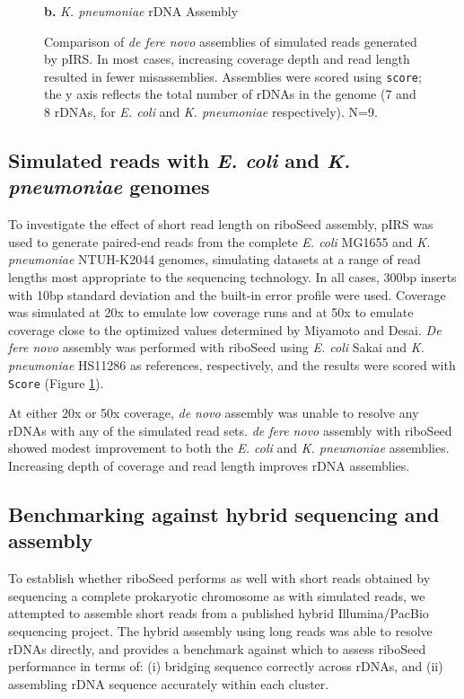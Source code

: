 \documentclass[a4,center,fleqn]{NAR}
\begin{document}
\begin{figure}[!ht]
\begin{minipage}{.45\textwidth}
    {\footnotesize \textbf{b.} \textit{K. pneumoniae} rDNA Assembly}
    \label{fig:sim_kleb}
  \end{minipage}%
  \caption{Comparison of \textit{de fere novo} assemblies of simulated reads generated by pIRS. In most cases, increasing coverage depth and read length resulted in fewer misassemblies. Assemblies were scored using \texttt{score}; the y axis reflects the total number of rDNAs in the genome (7 and 8 rDNAs, for \textit{E. coli} and \textit{K. pneumoniae} respectively). N=9.}
  \label{fig:simreads}
\end{figure}


\subsection*{Simulated reads with \textit{E. coli} and \textit{K. pneumoniae} genomes}

To investigate the effect of short read length on riboSeed assembly, pIRS\cite{Hu2012} was used to generate paired-end reads from the complete \textit{E. coli} MG1655 and \textit{K. pneumoniae} NTUH-K2044 genomes, simulating datasets at a range of read lengths most appropriate to the sequencing technology. In all cases, 300bp inserts with 10bp standard deviation and the built-in error profile were used. Coverage was simulated at 20x to emulate low coverage runs and at 50x to emulate coverage close to the optimized values determined by Miyamoto\cite{Miyamoto2014} and Desai\cite{Desai2013}. \textit{De fere novo} assembly was performed with riboSeed using \textit{E. coli} Sakai and \textit{K. pneumoniae} HS11286 as references, respectively, and the results were scored with \texttt{Score} (Figure \ref{fig:simreads}).


At either 20x or 50x coverage, \textit{de novo} assembly was unable to resolve any rDNAs with any of the simulated read sets. \textit{de fere novo} assembly with riboSeed showed modest improvement to both the \textit{E. coli} and \textit{K. pneumoniae} assemblies. Increasing depth of coverage and read length improves rDNA assemblies.




\subsection*{Benchmarking against hybrid sequencing and assembly}

To establish whether riboSeed performs as well with short reads obtained by sequencing a complete prokaryotic chromosome as with simulated reads, we attempted to assemble short reads from a published hybrid Illumina/PacBio sequencing project. The hybrid assembly using long reads was able to resolve rDNAs directly, and provides a benchmark against which to assess riboSeed performance in terms of: (i) bridging sequence correctly across rDNAs, and (ii) assembling rDNA sequence accurately within each cluster.
\end{document}
